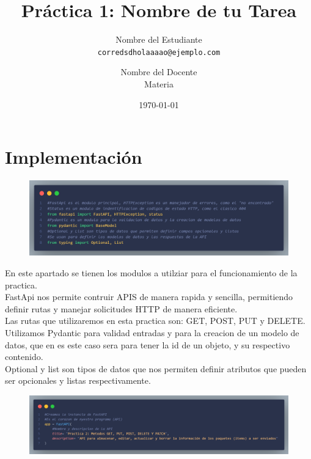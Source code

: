 \documentclass[12pt]{article}
\title{Práctica 1: Nombre de tu Tarea}
\author{
  Nombre del Estudiante \\
  \texttt{corredsdholaaaao@ejemplo.com}
  \and
  Nombre del Docente \\
  Materia
}
\date{\today}
\begin{document}
\maketitle
\thispagestyle{empty} %

\clearpage
{} %

\section{Implementación}
\begin{figure}[h!]
    \centering
    \includegraphics[width=1\textwidth]{Imagenes/Captura1_librerias.png}
\end{figure}

En este apartado se tienen los modulos a utilziar para el funcionamiento de la practica.\\
FastApi nos permite contruir APIS de manera rapida y sencilla, permitiendo definir rutas y manejar solicitudes HTTP de manera eficiente.\\
Las rutas que utilizaremos en esta practica son: GET, POST, PUT y DELETE.\\
Utilizamos Pydantic para validad entradas y para la creacion de un modelo de datos, que en es este caso sera para tener la id de un objeto, y su respectivo contenido.\\
Optional y list son tipos de datos que nos permiten definir atributos que pueden ser opcionales y listas respectivamente.\\


\begin{figure}[h!]
    \centering
    \includegraphics[width=1\textwidth]{Imagenes/Captura2_corazon del programa.png}
\end{figure}
\end{document}
